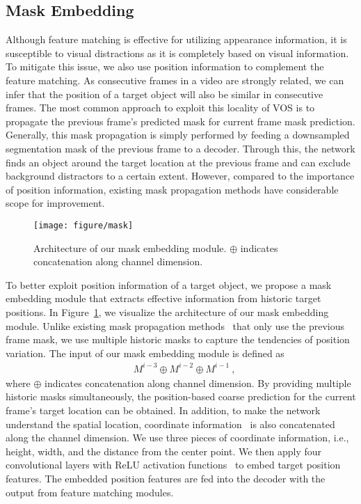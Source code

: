 \documentclass[10pt,twocolumn,letterpaper]{article}
\begin{document}
	
	\subsection{Mask Embedding}
	\label{mask embedding}
	Although feature matching is effective for utilizing appearance information, it is susceptible to visual distractions as it is completely based on visual information. To mitigate this issue, we also use position information to complement the feature matching. As consecutive frames in a video are strongly related, we can infer that the position of a target object will also be similar in consecutive frames. The most common approach to exploit this locality of VOS is to propagate the previous frame’s predicted mask for current frame mask prediction. Generally, this mask propagation is simply performed by feeding a downsampled segmentation mask of the previous frame to a decoder. Through this, the network finds an object around the target location at the previous frame and can exclude background distractors to a certain extent. However, compared to the importance of position information, existing mask propagation methods have considerable scope for improvement.
	
	
	\begin{figure}[t]
		\centering
		\texttt{[image: figure/mask]}
		\caption{Architecture of our mask embedding module. $\oplus$ indicates concatenation along channel dimension.}
		\label{figure4}
	\end{figure}
	
	
	To better exploit position information of a target object, we propose a mask embedding module that extracts effective information from historic target positions. In Figure~\ref{figure4}, we visualize the architecture of our mask embedding module. Unlike existing mask propagation methods~\cite{A-GAME, FEELVOS, RANet} that only use the previous frame mask, we use multiple historic masks to capture the tendencies of position variation. The input of our mask embedding module is defined as
	\begin{align}
	&M^{i-3} \oplus M^{i-2} \oplus M^{i-1}~,
	\label{eq20}
	\end{align}
	where $\oplus$ indicates concatenation along channel dimension. By providing multiple historic masks simultaneously, the position-based coarse prediction for the current frame’s target location can be obtained. In addition, to make the network understand the spatial location, coordinate information~\cite{coord} is also concatenated along the channel dimension. We use three pieces of coordinate information, i.e., height, width, and the distance from the center point. We then apply four convolutional layers with ReLU activation functions~\cite{relu} to embed target position features. The embedded position features are fed into the decoder with the output from feature matching modules.
	
\end{document}
